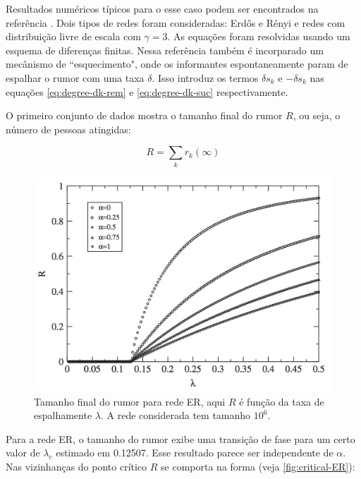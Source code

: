 \documentclass[a4paper,11pt]{report}
\begin{document}
Resultados num\'ericos t\'ipicos para o esse caso podem ser encontrados na refer\^encia \cite{Nekovee:2007jw}. Dois tipos de redes foram consideradas:  Erd\H{o}s e R\'enyi e redes com distribui\c{c}\~ao livre de escala com $\gamma=3$. As equa\c{c}\~oes foram resolvidas usando um esquema de diferen\c{c}as finitas. Nessa refer\^encia tamb\'em \'e incorparado um mec\^anismo de ``esquecimento", onde os informantes espontaneamente param de espalhar o rumor com uma taxa $\delta$. Isso introduz os termos $\delta s_k$ e $-\delta s_k$ nas equa\c{c}\~oes \ref{eq:degree-dk-rem} e \ref{eq:degree-dk-suc} respectivamente. 

O primeiro conjunto de dados mostra o tamanho final do rumor $R$, ou seja, o n\'umero de pessoas atingidas:

\begin{equation}
R=\sum_k r_k(\infty)
\label{eq:rumor-size}
\end{equation}

\begin{figure}[ht!]
\begin{center}
\includegraphics[scale=0.3]{./images/rumor-size-ER}
\end{center}
\caption{Tamanho final do rumor para rede ER, aqui $R$ \'e fun\c{c}\~ao da taxa de espalhamente $\lambda$. A rede considerada tem tamanho $10^6$.}
\label{fig:rumor-size-ER}
\end{figure}


Para a rede ER, o tamanho do rumor exibe uma transi\c{c}\~ao de fase para um certo valor de $\lambda_c$ estimado em 0.12507. Esse resultado parece ser independente de $\alpha$. Nas vizinhan\c{c}as do ponto cr\'itico $R$ se comporta na forma (veja \ref{fig:critical-ER}):
\end{document}
